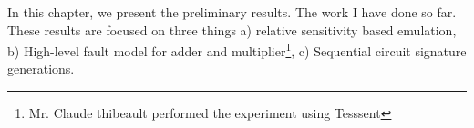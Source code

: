 In this chapter, we present the preliminary results. The work I have done so far. These results are focused on three things a) relative sensitivity based emulation, b) High-level fault model for adder and multiplier\footnote{Mr. Claude thibeault performed the experiment using Tesssent }, c) Sequential circuit signature generations.


\label{preliminary}

